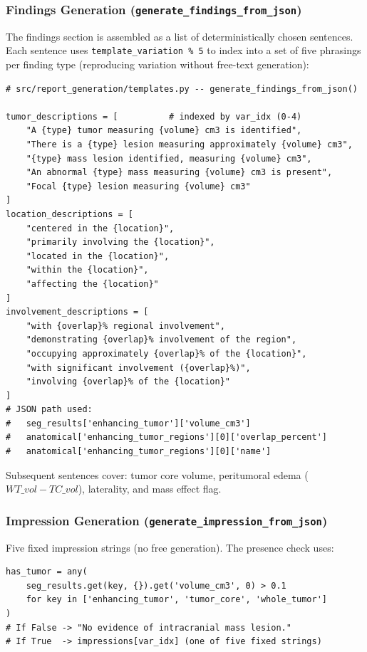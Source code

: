 \documentclass[conference]{IEEEtran}
\begin{document}
\subsubsection*{Findings Generation (\texttt{generate\_findings\_from\_json})}

The findings section is assembled as a list of deterministically chosen sentences. Each sentence uses \texttt{template\_variation \% 5} to index into a set of five phrasings per finding type (reproducing variation without free-text generation):

\begin{lstlisting}[style=pycode]
# src/report_generation/templates.py -- generate_findings_from_json()

tumor_descriptions = [          # indexed by var_idx (0-4)
    "A {type} tumor measuring {volume} cm3 is identified",
    "There is a {type} lesion measuring approximately {volume} cm3",
    "{type} mass lesion identified, measuring {volume} cm3",
    "An abnormal {type} mass measuring {volume} cm3 is present",
    "Focal {type} lesion measuring {volume} cm3"
]
location_descriptions = [
    "centered in the {location}",
    "primarily involving the {location}",
    "located in the {location}",
    "within the {location}",
    "affecting the {location}"
]
involvement_descriptions = [
    "with {overlap}% regional involvement",
    "demonstrating {overlap}% involvement of the region",
    "occupying approximately {overlap}% of the {location}",
    "with significant involvement ({overlap}%)",
    "involving {overlap}% of the {location}"
]
# JSON path used:
#   seg_results['enhancing_tumor']['volume_cm3']
#   anatomical['enhancing_tumor_regions'][0]['overlap_percent']
#   anatomical['enhancing_tumor_regions'][0]['name']
\end{lstlisting}

Subsequent sentences cover: tumor core volume, peritumoral edema ($WT\_vol - TC\_vol$), laterality, and mass effect flag.

\subsubsection*{Impression Generation (\texttt{generate\_impression\_from\_json})}

Five fixed impression strings (no free generation). The presence check uses:

\begin{lstlisting}[style=pycode]
has_tumor = any(
    seg_results.get(key, {}).get('volume_cm3', 0) > 0.1
    for key in ['enhancing_tumor', 'tumor_core', 'whole_tumor']
)
# If False -> "No evidence of intracranial mass lesion."
# If True  -> impressions[var_idx] (one of five fixed strings)
\end{lstlisting}
\end{document}
